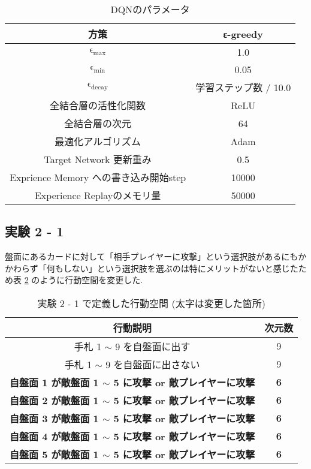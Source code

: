 \documentclass{jarticle}     %
\begin{document}
\begin{table}[h]
  \centering
  \caption{DQNのパラメータ}
  \label{table:updateparam}
  \begin{tabular}{|c||c|}
  \hline
  方策                 & ε-greedy \\ \hline
  $\mathrm{\epsilon_{max}}$                      & 1.0      \\ \hline
  $\mathrm{\epsilon_{min}}$                  & 0.05      \\ \hline
  $\mathrm{\epsilon_{decay}}$    & 学習ステップ数 / 10.0      \\ \hline       
  全結合層の活性化関数             & ReLU     \\ \hline
  全結合層の次元                & 64       \\ \hline
  最適化アルゴリズム              & Adam     \\ \hline
  Target Network 更新重み              & 0.5     \\ \hline
  Exprience Memory への書き込み開始step & 10000 \\ \hline
  Experience Replayのメモリ量 & 50000  \\ \hline
  \end{tabular}
  \end{table}

\subsection{実験 2 - 1 }
盤面にあるカードに対して「相手プレイヤーに攻撃」という選択肢があるにもかかわらず「何もしない」という選択肢を選ぶのは特にメリットがないと感じたため表 \ref{table:action2} のように行動空間を変更した.

\begin{table}[h]
  \centering
  \caption{実験 2 - 1 で定義した行動空間 (太字は変更した箇所)}
  \label{table:action2}
  \begin{tabular}{|c|c|}
  \hline
  行動説明                          & 次元数        \\ \hline
  手札 1 $\sim$ 9 を自盤面に出す             & 9          \\ \hline
  手札 1 $\sim$ 9 を自盤面に出さない & 9 \\ \hline
  \textbf{自盤面 1 が敵盤面 1 $\sim$ 5 に攻撃 or 敵プレイヤーに攻撃}    &  \textbf{6}          \\ \hline
  \textbf{自盤面 2 が敵盤面 1 $\sim$ 5 に攻撃 or 敵プレイヤーに攻撃}    & \textbf{6}   \\ \hline
  \textbf{自盤面 3 が敵盤面 1 $\sim$ 5 に攻撃 or 敵プレイヤーに攻撃}    & \textbf{6} \\ \hline
  \textbf{自盤面 4 が敵盤面 1 $\sim$ 5 に攻撃 or 敵プレイヤーに攻撃}    & \textbf{6} \\ \hline
  \textbf{自盤面 5 が敵盤面 1 $\sim$ 5 に攻撃 or 敵プレイヤーに攻撃}    & \textbf{6} \\ \hline
  \end{tabular}
  \end{table}
\end{document}
